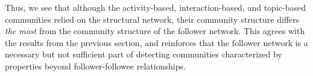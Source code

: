 \documentclass[10pt,letterpaper]{article}
\begin{document}
Thus, we see that although the activity-based, interaction-based, and topic-based communities relied on the structural network, their community structure differs \emph{the most} from the community structure of the follower network. This agrees with the results from the previous section, and reinforces that the follower network is a necessary but not sufficient part of detecting communities characterized by properties beyond follower-followee relationships.





\end{document}
